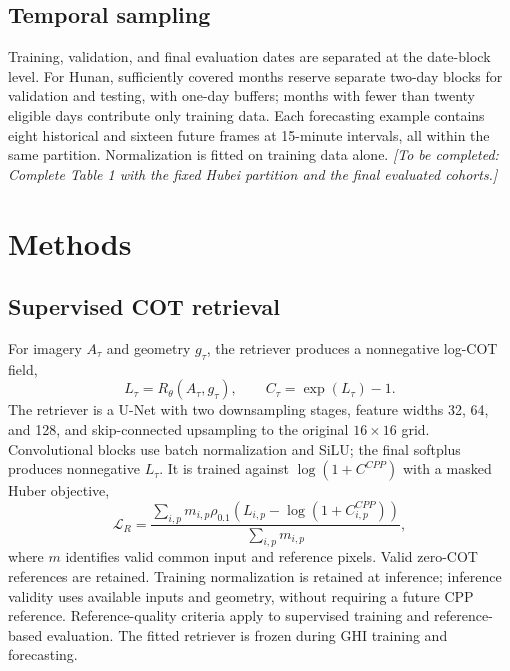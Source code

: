 \documentclass[11pt]{article}
\newcommand{\pending}[1]{\textit{[To be completed: #1]}}
\begin{document}
\subsection{Temporal sampling}
Training, validation, and final evaluation dates are separated at the date-block level. For Hunan, sufficiently covered months reserve separate two-day blocks for validation and testing, with one-day buffers; months with fewer than twenty eligible days contribute only training data. Each forecasting example contains eight historical and sixteen future frames at 15-minute intervals, all within the same partition. Normalization is fitted on training data alone. \pending{Complete Table 1 with the fixed Hubei partition and the final evaluated cohorts.}

\section{Methods}
\subsection{Supervised COT retrieval}
For imagery $A_\tau$ and geometry $g_\tau$, the retriever produces a nonnegative log-COT field,
\begin{equation}
L_\tau=R_\theta(A_\tau,g_\tau),\qquad C_\tau=\exp(L_\tau)-1.
\label{eq:retrieval}
\end{equation}
The retriever is a U-Net with two downsampling stages, feature widths 32, 64, and 128, and skip-connected upsampling to the original $16\times16$ grid. Convolutional blocks use batch normalization and SiLU; the final softplus produces nonnegative $L_\tau$. It is trained against $\log(1+C^{CPP})$ with a masked Huber objective,
\begin{equation}
\mathcal L_R=\frac{\sum_{i,p}m_{i,p}\rho_{0.1}\!\left(L_{i,p}-\log(1+C^{CPP}_{i,p})\right)}{\sum_{i,p}m_{i,p}},
\label{eq:retrieval-loss}
\end{equation}
where $m$ identifies valid common input and reference pixels. Valid zero-COT references are retained. Training normalization is retained at inference; inference validity uses available inputs and geometry, without requiring a future CPP reference. Reference-quality criteria apply to supervised training and reference-based evaluation. The fitted retriever is frozen during GHI training and forecasting.
\end{document}

